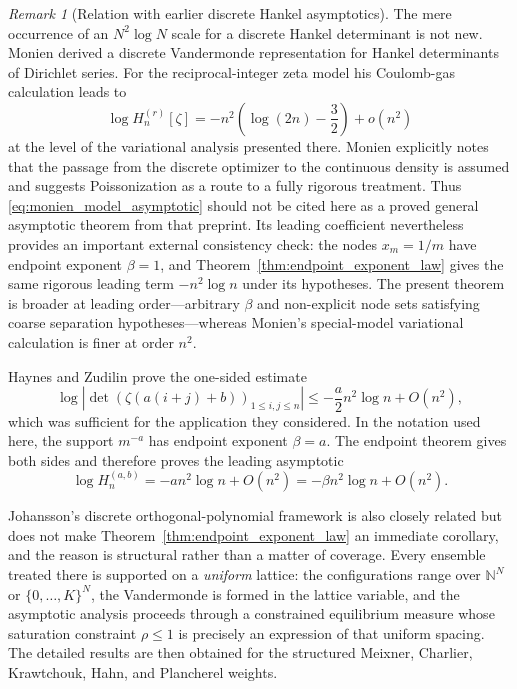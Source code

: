 \documentclass[preprint,12pt]{elsarticle}
\numberwithin{equation}{section}
\theoremstyle{plain}
\theoremstyle{definition}
\theoremstyle{remark}
\newtheorem{remark}[theorem]{Remark}
\begin{document}
\begin{remark}[Relation with earlier discrete Hankel asymptotics]
\label{rem:monien_haynes_position}
The mere occurrence of an $N^2\log N$ scale for a discrete Hankel determinant is not new. Monien \cite{Monien2009} derived a discrete Vandermonde representation for Hankel determinants of Dirichlet series.  For the reciprocal-integer zeta model his Coulomb-gas calculation leads to
\begin{equation}
\log H_n^{(r)}[\zeta]
=-n^2\left(\log(2n)-\frac32\right)+o(n^2)
\label{eq:monien_model_asymptotic}
\end{equation}
at the level of the variational analysis presented there.  Monien explicitly notes that the passage from the discrete optimizer to the continuous density is assumed and suggests Poissonization as a route to a fully rigorous treatment.  Thus \eqref{eq:monien_model_asymptotic} should not be cited here as a proved general asymptotic theorem from that preprint.  Its leading coefficient nevertheless provides an important external consistency check: the nodes $x_m=1/m$ have endpoint exponent $\beta=1$, and Theorem~\ref{thm:endpoint_exponent_law} gives the same rigorous leading term $-n^2\log n$ under its hypotheses.  The present theorem is broader at leading order---arbitrary $\beta$ and non-explicit node sets satisfying coarse separation hypotheses---whereas Monien's special-model variational calculation is finer at order $n^2$.

Haynes and Zudilin \cite{HaynesZudilin2015} prove the one-sided estimate
\begin{equation}
\log\left|\det(\zeta(a(i+j)+b))_{1\le i,j\le n}\right|
\le-\frac a2 n^2\log n+O(n^2),
\end{equation}
which was sufficient for the application they considered.  In the notation used here, the
support \(m^{-a}\) has endpoint exponent \(\beta=a\).  The endpoint theorem gives both sides
and therefore proves the leading asymptotic
\begin{equation}
\log H_n^{(a,b)}
=-a n^2\log n+O(n^2)
=-\beta n^2\log n+O(n^2).
\label{eq:HZ_comparison_full_law}
\end{equation}

Johansson's discrete orthogonal-polynomial framework \cite{Johansson2001} is also closely related but does not make Theorem~\ref{thm:endpoint_exponent_law} an immediate corollary, and the reason is structural rather than a matter of coverage.  Every ensemble treated there is supported on a \emph{uniform} lattice: the configurations range over $\mathbb N^N$ or $\{0,\dots,K\}^N$, the Vandermonde is formed in the lattice variable, and the asymptotic analysis proceeds through a constrained equilibrium measure whose saturation constraint $\rho\le1$ is precisely an expression of that uniform spacing.  The detailed results are then obtained for the structured Meixner, Charlier, Krawtchouk, Hahn, and Plancherel weights.


\end{remark}
\end{document}
